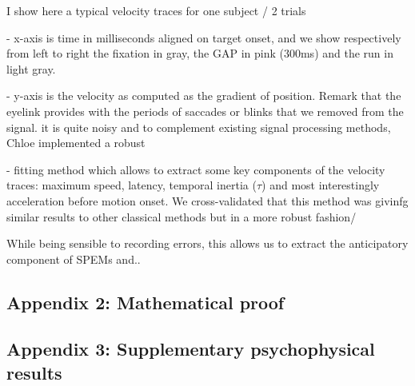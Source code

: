 \documentclass[profile,final,english, draft]{article}%
\newcommand{\Jj}{\mathcal{J}}
\newcommand{\seeApp}[1]{see Appendix~\ref{app:#1}}
\begin{document}
I show here a typical velocity traces for one subject / 2 trials

- x-axis is time in milliseconds aligned on target onset,
and we show respectively from left to right the fixation in gray,
the GAP in pink (300ms) and the run in light gray.

- y-axis is the velocity as computed as the gradient of position.
Remark that the eyelink provides with the periods of saccades or
 blinks that we removed from the signal. it is quite noisy and
 to complement existing signal processing methods,
 Chloe implemented a robust

- fitting method which allows to extract some key components of
the velocity traces: maximum speed, latency, temporal inertia ($\tau$)
 and most interestingly acceleration before motion onset.
 We cross-validated that this method was givinfg similar results
  to other classical methods but in a more robust fashion/

While being sensible to recording errors, this allows us to extract the
 anticipatory component of SPEMs and..


\subsection{Appendix 2: Mathematical proof}
\label{app:bcp}

\subsection{Appendix 3: Supplementary psychophysical results}
\label{app:results_psycho}

{\tiny
\printbibliography
}
\end{document}
